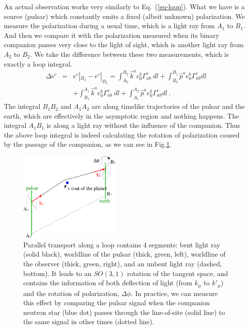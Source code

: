 \documentclass[aps,showpacs,twocolumn,floats,prd,superscriptaddress,nofootinbib]{revtex4}
\begin{document}
An actual observation works very similarly to Eq.~(\ref{eq-loop}). 
What we have is a source (pulsar) which constantly emits a fixed (albeit unknown) polarization. 
We measure the polarization during a usual time, which is a light ray from $A_1$ to $B_1$. 
And then we compare it with the polarization measured when its binary companion passes very close to the light of sight, which is another light ray from $A_2$ to $B_2$. 
We take the difference between these two measurements, which is exactly a loop integral.
\begin{eqnarray}
\Delta e^c &=& e^c|_{ B_2} - e^c|_{ B_1}
= \int_{A_2}^{B_2} \hat{k}^a e_0^b \Gamma_{ab}^c~dl
 + \int_{B_2}^{B_1} \hat{p}^a e_0^b \Gamma_{ab}^c dl  \nonumber \\ 
&&+ \int_{B_1}^{A_1} \hat{k}^a e_0^b \Gamma_{ab}^c~dl +
\int_{A_1}^{A_2} \hat{p}^a e_0^b \Gamma_{ab}^c dl~.
\label{eq-pulsar}
\end{eqnarray}
The integral $B_1B_2$ and $A_1A_2$ are along timelike trajectories of the pulsar and the earth, which are effectively in the asymptotic region and nothing happens. 
The integral $A_1B_1$ is along a light ray without the influence of the companion. 
Thus the above loop integral is indeed calculating the rotation of polarization caused by the passage of the companion, as we can see in Fig.\ref{fig:loop}.

\begin{figure}
\includegraphics[width=0.45\textwidth]{loop.pdf}
\caption{\label{fig:loop}
Parallel transport along a loop contains 4 segments: bent light ray (solid black), worldline of the pulsar (thick, green, left), worldline of the observer (thick, green, right), and an unbent light ray (dashed, bottom). It leads to an $SO(3,1)$ rotation of the tangent space, and contains the information of both deflection of light (from $k_\mu$ to $k'_\mu$) and the rotation of polarization, $\Delta\phi$. In practice, we can measure this effect by comparing the pulsar signal when the companion neutron star (blue dot) passes through the line-of-site (solid line) to the same signal in other times (dotted line).
}
\end{figure}
\end{document}
